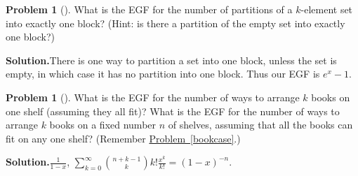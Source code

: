 \documentclass[10pt,]{book}
\theoremstyle{plain}
\theoremstyle{definition}
\newtheorem{activity}[project]{Problem}
\theoremstyle{definition}
\numberwithin{equation}{chapter}
\begin{document}
\begin{activity}[]\label{oneblockpartitions}
What is the EGF for the number of partitions of a \(k\)-element set into exactly one block? (Hint: is there a partition of the empty set into exactly one block?)%
\par\medskip\noindent%
\textbf{Solution.}\quad There is one way to partition a set into one block, unless the set is empty, in which case it has no partition into one block. Thus our EGF is \(e^x-1\).%
\end{activity}
\begin{activity}[]\label{exponentialbookshelf}
What is the EGF for the number of ways to arrange \(k\) books on one shelf (assuming they all fit)? What is the EGF for the number of ways to arrange \(k\) books on a fixed number \(n\) of shelves, assuming that all the books can fit on any one shelf? (Remember \hyperref[bookcase]{Problem~\ref{bookcase}}.)%
\par\medskip\noindent%
\textbf{Solution.}\quad \(\frac{1}{1-x}\), \(\sum_{k=0}^\infty \binom{n+k-1}{k}k!\frac{x^k}{k!} = (1-x)^{-n}\).%
\end{activity}
\typeout{************************************************}
\typeout{************************************************}
\end{document}
